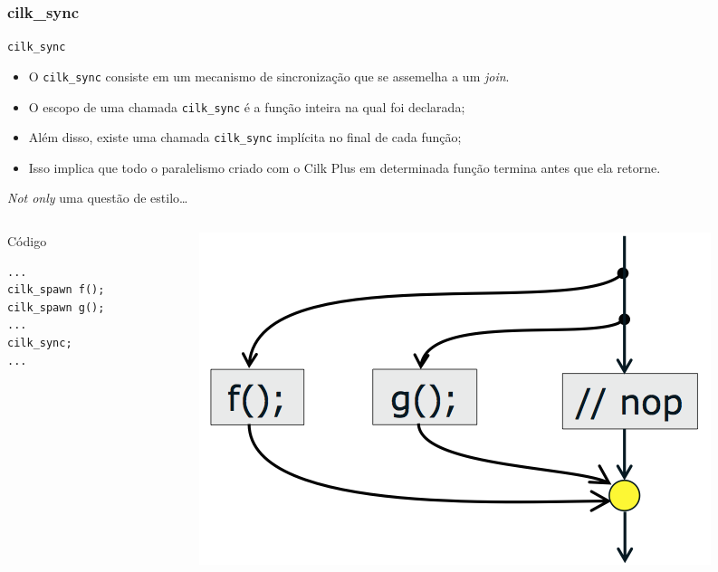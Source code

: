 \documentclass{beamer}
\begin{document}
\subsubsection{cilk\_sync}
\begin{frame}{\texttt{cilk\_sync}}
\begin{itemize}
    \item O \texttt{cilk\_sync} consiste em um mecanismo de sincronização que se
    assemelha a um \textit{join}.
    \item O escopo de uma chamada \texttt{cilk\_sync} é a função inteira na qual
    foi declarada;
    \item Além disso, existe uma chamada \texttt{cilk\_sync} implícita no final de
    cada função;
    \item Isso implica que todo o paralelismo criado com o Cilk Plus em
    determinada função termina antes que ela retorne.
\end{itemize}
\end{frame}

\begin{frame}[fragile]{\emph{Not only} uma questão de estilo\ldots}
\begin{columns}[c]

\begin{column}{0.3\textwidth}
\begin{block}{Código}
\begin{lstlisting}
...
cilk_spawn f();
cilk_spawn g();
...
cilk_sync;
...
\end{lstlisting}
\end{block}
\end{column}

\pause

\begin{column}{0.6\textwidth}
\begin{figure}
    \centering
    \includegraphics[width=\columnwidth]{./img/bad-style.png}
\end{figure}
\end{column}
\end{columns}
\end{frame}
\end{document}

